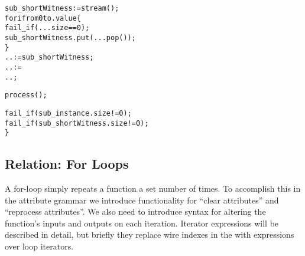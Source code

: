 \begin{alltt}
    sub_shortWitness := stream();
    for i from 0 to .value \{
      fail_if(...size == 0);
      sub_shortWitness.put(...pop());
    \}
    .. := sub_shortWitness;
    .. :=
      ..;

    process();

    fail_if(sub_instance.size != 0);
    fail_if(sub_shortWitness.size != 0);
  \}
\end{alltt}

\subsection{Relation: For Loops}\label{for_loops_text}
A for-loop simply repeats a function a set number of times.
To accomplish this in the attribute grammar we introduce functionality for ``clear attributes'' and ``reprocess attributes''.
We also need to introduce syntax for altering the function's inputs and outputs on each iteration.
Iterator expressions will be described in detail, but briefly they replace wire indexes in the  with expressions over loop iterators.\\

